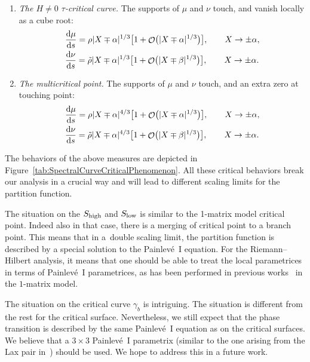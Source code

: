\documentclass[pdftex]{sigma}
\DeclareMathOperator{\OO}{\mathcal{O}}
\numberwithin{equation}{section}
\begin{document}
\begin{enumerate}
\begin{align*}
 \end{align*}
 \item \textit{The $H\neq 0$ $\tau$-critical curve.}
 The supports of $\mu$ and $\nu$ touch, and vanish locally as a cube root:
 \begin{align*}
 &\frac{{\rm d}\mu}{{\rm d}s}= \rho |X\mp\alpha|^{1/3}\bigl[1 + \OO\bigl(|X\mp\alpha|^{1/3}\bigr)\bigr], \qquad X\to \pm\alpha,\\
 &\frac{{\rm d}\nu}{{\rm d}s}= \tilde{\rho} |X\mp\alpha|^{1/3}\bigl[1 + \OO\bigl(|X\mp\beta|^{1/3}\bigr)\bigr], \qquad X\to \pm\alpha.
 \end{align*}
 \item \textit{The multicritical point.}
 The supports of $\mu$ and $\nu$ touch, and an extra zero at touching point:
 \begin{align*}
 &\frac{{\rm d}\mu}{{\rm d}s}= \rho |X\mp\alpha|^{4/3}\bigl[1 + \OO\bigl(|X\mp\alpha|^{1/3}\bigr)\bigr], \qquad X\to \pm\alpha,\\
 &\frac{{\rm d}\nu}{{\rm d}s}= \tilde{\rho} |X\mp\alpha|^{4/3}\bigl[1 + \OO\bigl(|X\mp\beta|^{1/3}\bigr)\bigr], \qquad X\to \pm\alpha.
 \end{align*}
 \end{enumerate}


The behaviors of the above measures are depicted in Figure~\ref{tab:SpectralCurveCriticalPhenomenon}. All these critical behaviors break our analysis in a crucial way and will lead to different scaling limits for the partition function.


The situation on the $S_{{\rm high}}$ and $S_{{\rm low}}$ is similar to the 1-matrix model critical point. Indeed also in that case, there is a merging of critical point to a branch point. This means that in a~double scaling limit, the partition function is described by a special solution to the Painlev\'e~I equation. For the Riemann--Hilbert analysis, it means that one should be able to treat the local parametrices in terms of Painlev\'{e}~I parametrices, as has been
 performed in previous works~\cite{BleherDeano, DK0} in the $1$-matrix model.

The situation on the critical curve $\gamma_b$ is intriguing. The situation is different from the rest for the critical surface. Nevertheless, we still expect that the phase transition is described by the same Painlev\'e~I equation as on the critical surfaces. We believe that a $3\times 3$ Painlev\'{e}~I parametrix (similar to the one arising from the Lax pair in~\cite{JKT}) should be used. We hope to address this in a future work.
\end{document}

